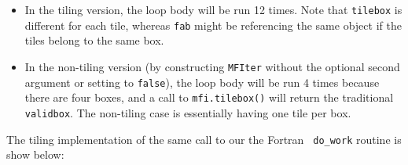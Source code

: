 \begin{itemize}
\item In the tiling version, the loop body will be run 12 times.  Note
  that {\tt tilebox} is different for each tile, whereas {\tt fab}
  might be referencing the same object if the tiles belong to the same
  box.

\item In the non-tiling version (by constructing {\tt MFIter} without
  the optional second argument or setting to {\tt false}), the loop
  body will be run 4 times because there are four boxes, and a call to
  {\tt mfi.tilebox()} will return the traditional {\tt validbox}.  The
  non-tiling case is essentially having one tile per box.
\end{itemize}


The tiling implementation of the same call to our the Fortran {\tt
  do\_work} routine is show below:

